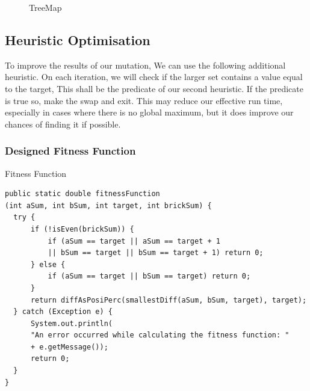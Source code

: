 \documentclass[a4paper]{article}
\begin{document}
\begin{figure}[!ht]
\centering
\vspace{8mm}
\caption{TreeMap} \label{fig:M1}
\end{figure}



\vspace{12mm}
\subsection{Heuristic Optimisation}

To improve the results of our mutation, We can use the following additional heuristic.
On each iteration, we will check if the larger set contains a value equal to the target,
This shall be the predicate of our second heuristic.
If the predicate is true so, make the swap and exit. This may reduce our effective run time,
especially in cases where there is no global maximum, but it does improve our chances of finding it if possible. \\



\newpage
\subsubsection{Designed Fitness Function}

\makeatletter
\renewcommand{\ALG@name}{Fitness Function}
\makeatother
\setcounter{algorithm}{0}

\begin{algorithm}
\caption{Fitness Function}\label{euclid}

\begin{verbatim}
public static double fitnessFunction
(int aSum, int bSum, int target, int brickSum) {
  try {
      if (!isEven(brickSum)) {
          if (aSum == target || aSum == target + 1 
          || bSum == target || bSum == target + 1) return 0;
      } else {
          if (aSum == target || bSum == target) return 0;
      }
      return diffAsPosiPerc(smallestDiff(aSum, bSum, target), target);
  } catch (Exception e) {
      System.out.println(
      "An error occurred while calculating the fitness function: " 
      + e.getMessage());
      return 0;
  }
}
\end{verbatim}
\end{algorithm}
\vspace{4mm}
\end{document}
